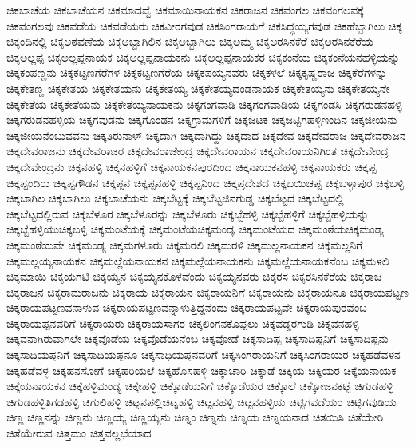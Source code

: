 {ಚಿಕಬಾಚೆಯ
ಚಿಕಬಾಚೆಯನ
ಚಿಕಮಾದವ್ವೆ
ಚಿಕಮಾಯಿನಾಯಕನ
ಚಿಕರಾಜನ
ಚಿಕವಂಗಲ
ಚಿಕವಂಗಲವಕ್ಕೆ
ಚಿಕವಂಗಲವು
ಚಿಕವಡೆಯ
ಚಿಕವಡೆಯರು
ಚಿಕವೀರಗವುಡ
ಚಿಕಸಿಂಗರಾಯಗೆ
ಚಿಕಸಿದ್ಧಯ್ಯಗವುಡ
ಚಿಕಹೆಬ್ಬಾಗಿಲು
ಚಿಕ್ಕ
ಚಿಕ್ಕಂದಿನಲ್ಲಿ
ಚಿಕ್ಕಅಠವಣೆಯ
ಚಿಕ್ಕಅಬ್ಬಾಗಿಲಿನ
ಚಿಕ್ಕಅಬ್ಬಾಗಿಲು
ಚಿಕ್ಕಅಮ್ಮ
ಚಿಕ್ಕಅರಸಿನಕೆರೆ
ಚಿಕ್ಕಅರಸಿನಕೆರೆಯ
ಚಿಕ್ಕಅಲ್ಲಪ್ಪ
ಚಿಕ್ಕಅಲ್ಲಪ್ಪನಾಯಕ
ಚಿಕ್ಕಅಲ್ಲಪ್ಪನಾಯಕನು
ಚಿಕ್ಕಅಲ್ಲಪ್ಪನಾಯಕರ
ಚಿಕ್ಕಕಂನೆಯ
ಚಿಕ್ಕಕಂನೆಯನಹಳ್ಳಿಯನ್ನು
ಚಿಕ್ಕಕಂಪಣ್ಣನು
ಚಿಕ್ಕಕಟ್ಟಣಗೆರೆಗಳ
ಚಿಕ್ಕಕಟ್ಟಣಗೆರೆಯ
ಚಿಕ್ಕಕಪಯ್ಯನವರು
ಚಿಕ್ಕಕಳಲೆ
ಚಿಕ್ಕಕೃಷ್ಣರಾಜ
ಚಿಕ್ಕಕೆರೆಗಳನ್ನು
ಚಿಕ್ಕಕೇತಣ್ಣ
ಚಿಕ್ಕಕೇತಯ
ಚಿಕ್ಕಕೇತಯನು
ಚಿಕ್ಕಕೇತಯ್ಯ
ಚಿಕ್ಕಕೇತಯ್ಯದಂಡನಾಯಕ
ಚಿಕ್ಕಕೇತಯ್ಯನು
ಚಿಕ್ಕಕೇತಯ್ಯನೇ
ಚಿಕ್ಕಕೇತೆಯ
ಚಿಕ್ಕಕೇತೆಯನು
ಚಿಕ್ಕಕೇತೆಯ್ಯನಾಯಕನು
ಚಿಕ್ಕಗಂಗವಾಡಿ
ಚಿಕ್ಕಗಂಗವಾಡಿಯ
ಚಿಕ್ಕಗಂಡಸಿ
ಚಿಕ್ಕಗರುಡನಹಳ್ಳಿ
ಚಿಕ್ಕಗರುಡನಹಳ್ಳಿಯ
ಚಿಕ್ಕಗವುಡನು
ಚಿಕ್ಕಗೊಂಡನ
ಚಿಕ್ಕಗ್ರಾಮಗಳಿಗೆ
ಚಿಕ್ಕಜಟಕ
ಚಿಕ್ಕಜಟ್ಟಿಗಹಳ್ಳಿಇಂದಿನ
ಚಿಕ್ಕಜೀಯನು
ಚಿಕ್ಕಜೀಯನೆಂಬುವವನು
ಚಿಕ್ಕತಿರುನಾಳ್
ಚಿಕ್ಕದಾಗಿ
ಚಿಕ್ಕದಾಗಿದ್ದು
ಚಿಕ್ಕದಾದ
ಚಿಕ್ಕದೇವ
ಚಿಕ್ಕದೇವರಾಜ
ಚಿಕ್ಕದೇವರಾಜನ
ಚಿಕ್ಕದೇವರಾಜನು
ಚಿಕ್ಕದೇವರಾಜರ
ಚಿಕ್ಕದೇವರಾಜೇಂದ್ರ
ಚಿಕ್ಕದೇವರಾಯನ
ಚಿಕ್ಕದೇವರಾಯನಿಗಿಂತ
ಚಿಕ್ಕದೇವೇಂದ್ರ
ಚಿಕ್ಕದೇವೇಂದ್ರನು
ಚಿಕ್ಕನಹಳ್ಳಿ
ಚಿಕ್ಕನಹಳ್ಳಿಗೆ
ಚಿಕ್ಕನಾಯಕನಪುರದಿಂದ
ಚಿಕ್ಕನಾಯಕನಹಳ್ಳಿ
ಚಿಕ್ಕನಾಯಕರು
ಚಿಕ್ಕಪ್ಪ
ಚಿಕ್ಕಪ್ಪಂದಿರು
ಚಿಕ್ಕಪ್ಪಗೌಡನ
ಚಿಕ್ಕಪ್ಪನ
ಚಿಕ್ಕಪ್ಪನಹಳ್ಳಿ
ಚಿಕ್ಕಪ್ಪನಿಂದ
ಚಿಕ್ಕಪ್ರದೇಶದ
ಚಿಕ್ಕಬಯಿಚಪ್ಪ
ಚಿಕ್ಕಬಳ್ಳಾಪುರ
ಚಿಕ್ಕಬಳ್ಳಿ
ಚಿಕ್ಕಬಾಗಿಲ
ಚಿಕ್ಕಬಾಗಿಲು
ಚಿಕ್ಕಬಾಚೆಯನು
ಚಿಕ್ಕಬೆಟ್ಟಕ್ಕೆ
ಚಿಕ್ಕಬೆಟ್ಟಜಿನಗುಡ್ಡ
ಚಿಕ್ಕಬೆಟ್ಟದ
ಚಿಕ್ಕಬೆಟ್ಟದಲ್ಲಿ
ಚಿಕ್ಕಬೆಟ್ಟದಲ್ಲಿರುವ
ಚಿಕ್ಕಬೆಳೂರ
ಚಿಕ್ಕಬೆಳೂರನ್ನು
ಚಿಕ್ಕಬೆಳೂರು
ಚಿಕ್ಕಬ್ಬೆಹಳ್ಳಿ
ಚಿಕ್ಕಬ್ಬೆಹಳ್ಳಿಗೆ
ಚಿಕ್ಕಬ್ಬೆಹಳ್ಳಿಯನ್ನು
ಚಿಕ್ಕಬ್ಬೆಹಳ್ಳಿಯುಚಿಕ್ಕಬಳ್ಳಿ
ಚಿಕ್ಕಮಂಟೆಯಕ್ಕೆ
ಚಿಕ್ಕಮಂಟೆಯಚಿಕ್ಕಮಂಡ್ಯ
ಚಿಕ್ಕಮಂಟೆಯದ
ಚಿಕ್ಕಮಂಠೆಯಚಿಕ್ಕಮಂಡ್ಯ
ಚಿಕ್ಕಮಂಠೆಯವೇ
ಚಿಕ್ಕಮಂಡ್ಯ
ಚಿಕ್ಕಮಗಳೂರು
ಚಿಕ್ಕಮರಲಿ
ಚಿಕ್ಕಮರಳಿ
ಚಿಕ್ಕಮಲ್ಲನಾಯಕನ
ಚಿಕ್ಕಮಲ್ಲನಿಗೆ
ಚಿಕ್ಕಮಲ್ಲಯ್ಯನಾಯಕನ
ಚಿಕ್ಕಮಲ್ಲೆಯನಾಯಕನ
ಚಿಕ್ಕಮಲ್ಲೆಯನಾಯಕನು
ಚಿಕ್ಕಮಲ್ಲೆಯನಾಯಕನೆಂಬ
ಚಿಕ್ಕಮಳಲಿ
ಚಿಕ್ಕಮಾಯಿ
ಚಿಕ್ಕಯಗಟಿ
ಚಿಕ್ಕಯ್ಯನ
ಚಿಕ್ಕಯ್ಯನಕೊಳವೆಂದು
ಚಿಕ್ಕಯ್ಯನವರು
ಚಿಕ್ಕರಸ
ಚಿಕ್ಕರಸಿನಕೆರೆಯ
ಚಿಕ್ಕರಾಜ
ಚಿಕ್ಕರಾಜನ
ಚಿಕ್ಕರಾಮರಾಜನು
ಚಿಕ್ಕರಾಯ
ಚಿಕ್ಕರಾಯನ
ಚಿಕ್ಕರಾಯನಿಗೆ
ಚಿಕ್ಕರಾಯನು
ಚಿಕ್ಕರಾಯನೂ
ಚಿಕ್ಕರಾಯಪಟ್ಟಣ
ಚಿಕ್ಕರಾಯಪಟ್ಟಣವನಾಳುವ
ಚಿಕ್ಕರಾಯಪಟ್ಟಣವನ್ನಾಳುತ್ತಿದ್ದನೆಂದು
ಚಿಕ್ಕರಾಯಪಟ್ಟವೇ
ಚಿಕ್ಕರಾಯಪುರವೆಂಬ
ಚಿಕ್ಕರಾಯಪ್ಪನವರಿಗೆ
ಚಿಕ್ಕರಾಯರು
ಚಿಕ್ಕರಾಯಸಾಗರ
ಚಿಕ್ಕಲಿಂಗನಕೊಪ್ಪಲು
ಚಿಕ್ಕವಡ್ಡರಗುಡಿ
ಚಿಕ್ಕವನಹಳ್ಳಿ
ಚಿಕ್ಕವನಾಗಿರುವಾಗಲೇ
ಚಿಕ್ಕವೊಡೆಯ
ಚಿಕ್ಕವೊಡೆಯನೆಂಬ
ಚಿಕ್ಕವೋಡೆ
ಚಿಕ್ಕಸಾದಿಪ್ಪ
ಚಿಕ್ಕಸಾದಿಪ್ಪನಿಗೆ
ಚಿಕ್ಕಸಾದಿಪ್ಪನು
ಚಿಕ್ಕಸಾದಿಯಪ್ಪನಿಗೆ
ಚಿಕ್ಕಸಾದಿಯಪ್ಪನೂ
ಚಿಕ್ಕಸಾಧಿಯಪ್ಪನವರಿಗೆ
ಚಿಕ್ಕಸಿಂಗರಾಯನಿಗೆ
ಚಿಕ್ಕಸಿಂಗರಾಯರ
ಚಿಕ್ಕಹಡೆವಳನ
ಚಿಕ್ಕಹಡೆವಳ್ಳ
ಚಿಕ್ಕಹನಸೋಗೆ
ಚಿಕ್ಕಹರಿಯಲೆ
ಚಿಕ್ಕಹೊಸಹಳ್ಳಿ
ಚಿಕ್ಕಾಚಾರಿ
ಚಿಕ್ಕಾಡೆ
ಚಿಕ್ಕಿಯ
ಚಿಕ್ಕಿಯರ
ಚಿಕ್ಕೆಯನಾಯಕ
ಚಿಕ್ಕೆಯನಾಯಕನ
ಚಿಕ್ಕೆಹಳ್ಳಿಮಂಡ್ಯ
ಚಿಕ್ಕೇಹಳ್ಳಿ
ಚಿಕ್ಕೊಡೆಯನಿಗೆ
ಚಿಕ್ಕೊಡೆಯರ
ಚಿಕ್ಕೊಲೆ
ಚಿಕ್ಕೋಜನಕಟ್ಟೆ
ಚಿಗುಡಹಳ್ಳಿ
ಚಿಗುಡಹಳ್ಳಿತಿಗಡಹಳ್ಳಿ
ಚಿಗುಲಿಹಳ್ಳಿ
ಚಿಟ್ಟನಪಲ್ಲಿಚಿಟ್ನಹಳ್ಳಿ
ಚಿಟ್ಟನಹಳ್ಳಿ
ಚಿಟ್ಟನಹಳ್ಳಿಯ
ಚಿಟ್ಟಿಗವಡೆಯರ
ಚಿಟ್ಟಿಗವುಡಿಯ
ಚಿಣ್ಣ
ಚಿಣ್ಣನನ್ನು
ಚಿಣ್ಣನು
ಚಿಣ್ಣಯ್ಯ
ಚಿಣ್ಣಯ್ಯನು
ಚಿಣ್ನಂ
ಚಿಣ್ನನು
ಚಿಣ್ನಯ
ಚಿಣ್ನಯನಾಡ
ಚಿತಯಿಸಿ
ಚಿತೆಯೇರಿ
ಚಿತೆಯೇರುವ
ಚಿತ್ತಮಂ
ಚಿತ್ತವಲ್ಲಭೆಯಾದ
}
